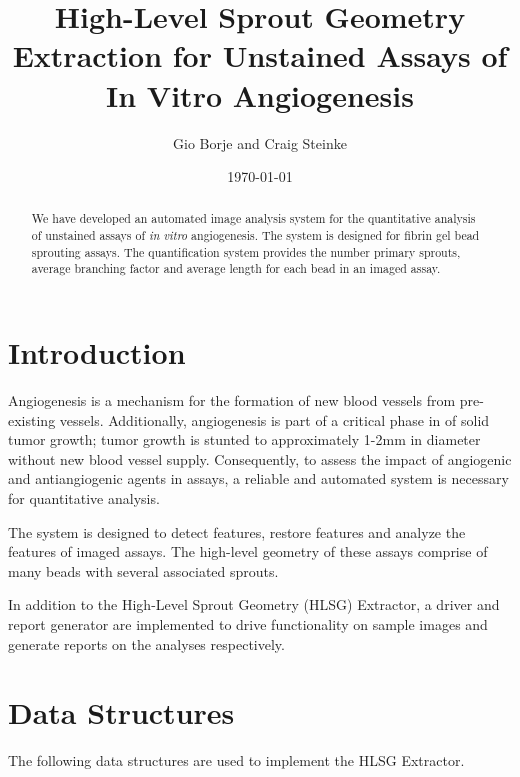\documentclass{sig-alternate}
\begin{document}
\title{High-Level Sprout Geometry Extraction for Unstained Assays of In Vitro Angiogenesis}
\author{
	Gio Borje and Craig Steinke \\
}
\date{\today}
\maketitle

\begin{abstract}
	We have developed an automated image analysis system for the
	quantitative analysis of unstained assays of \emph{in vitro}
	angiogenesis. The system is designed for fibrin gel bead sprouting
	assays. The quantification system provides the number primary sprouts,
	average branching factor and average length for each bead in an imaged
	assay.
\end{abstract}

\section{Introduction} %
\label{sec:Introduction}
	Angiogenesis is a mechanism for the formation of new blood vessels from
	pre-existing vessels. Additionally, angiogenesis is part of a critical
	phase in of solid tumor growth; tumor growth is stunted to
	approximately 1-2mm in diameter without new blood vessel supply.
	Consequently, to assess the impact of angiogenic and antiangiogenic
	agents in assays, a reliable and automated system is necessary for
	quantitative analysis.

	The system is designed to detect features, restore features and analyze
	the features of imaged assays. The high-level geometry of these assays
	comprise of many beads with several associated sprouts.

	In addition to the High-Level Sprout Geometry (HLSG) Extractor, a
	driver and report generator are implemented to drive functionality on
	sample images and generate reports on the analyses respectively.

\section{Data Structures} %
\label{sec:Data Structures}
	The following data structures are used to implement the HLSG Extractor.
\end{document}
